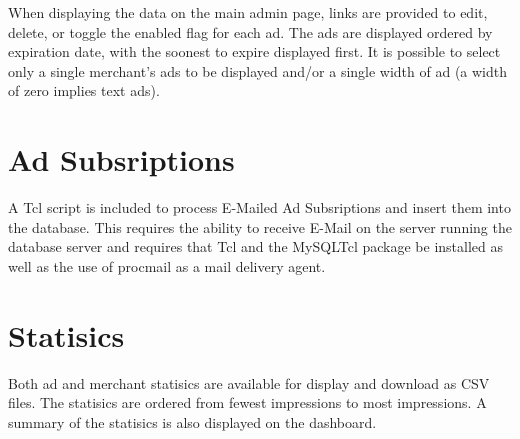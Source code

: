 \documentclass[letterpaper]{article}
\begin{document}
When displaying the data on the main admin page, links are provided
to edit, delete, or toggle the enabled flag for each ad. The ads are
displayed ordered by expiration date, with the soonest to expire
displayed first. It is possible to select only a single merchant's ads
to be displayed and/or a single width of ad (a width of zero implies
text ads).

\section{Ad Subsriptions}

A Tcl script is included to process E-Mailed Ad Subsriptions and
insert them into the database.  This requires the ability to receive
E-Mail on the server running the database server and requires that Tcl
and the MySQLTcl package be installed as well as the use of procmail as
a mail delivery agent.

\section{Statisics}

Both ad and merchant statisics are available for display and download
as CSV files.  The statisics are ordered from fewest impressions to
most impressions. A summary of the statisics is also displayed on the
dashboard.
\end{document}
